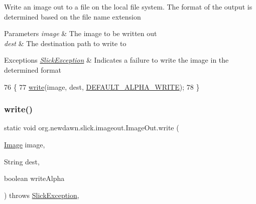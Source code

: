 Write an image out to a file on the local file system. The format of the output is determined based on the file name extension


\begin{DoxyParams}{Parameters}
{\em image} & The image to be written out \\
\hline
{\em dest} & The destination path to write to \\
\hline
\end{DoxyParams}

\begin{DoxyExceptions}{Exceptions}
{\em \mbox{\hyperlink{classorg_1_1newdawn_1_1slick_1_1_slick_exception}{Slick\+Exception}}} & Indicates a failure to write the image in the determined format \\
\hline
\end{DoxyExceptions}

\begin{DoxyCode}
76                                                                              \{
77         \mbox{\hyperlink{classorg_1_1newdawn_1_1slick_1_1imageout_1_1_image_out_a3b5d59b0d7fbacc07f04a2e3c687cd74}{write}}(image, dest, \mbox{\hyperlink{classorg_1_1newdawn_1_1slick_1_1imageout_1_1_image_out_a914d905541d22894588097301e2fc5fb}{DEFAULT\_ALPHA\_WRITE}});
78     \}
\end{DoxyCode}
\mbox{\label{classorg_1_1newdawn_1_1slick_1_1imageout_1_1_image_out_a4fb9c013b521ae23b30074fb75a5da24}} 
\subsubsection{\texorpdfstring{write()}{write()}\hspace{0.1cm}{\footnotesize\ttfamily [4/6]}}
{\footnotesize\ttfamily static void org.\+newdawn.\+slick.\+imageout.\+Image\+Out.\+write (\begin{DoxyParamCaption}\item[{\mbox{\hyperlink{classorg_1_1newdawn_1_1slick_1_1_image}{Image}}}]{image,  }\item[{String}]{dest,  }\item[{boolean}]{write\+Alpha }\end{DoxyParamCaption}) throws \mbox{\hyperlink{classorg_1_1newdawn_1_1slick_1_1_slick_exception}{Slick\+Exception}}\hspace{0.3cm}{\ttfamily [inline]}, {\ttfamily [static]}}

